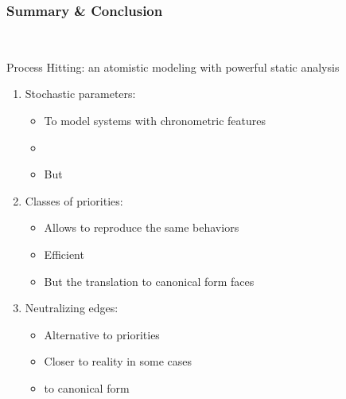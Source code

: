 
\begin{frame}[c]
  \frametitle{Summary \& Conclusion}

~

\vfill

Process Hitting: an atomistic modeling with powerful static analysis

\medskip
\begin{enumerate}[1.]
  \item Stochastic parameters:
    \begin{itemize}
      \item To model systems with chronometric features
      \item {}
      \item But 
    \end{itemize}
  \item Classes of priorities:
    \begin{itemize}
      \item Allows to reproduce the same behaviors
      \item Efficient 
      \item But the translation to canonical form faces 
    \end{itemize}
  \item Neutralizing edges:
    \begin{itemize}
      \item Alternative to priorities
      \item Closer to reality in some cases
      \item {} to canonical form
    \end{itemize}
\end{enumerate}

\vfill
\Large
\begin{flushright}
  \hspace{1cm}~
\end{flushright}
\vfill

~

\end{frame}

